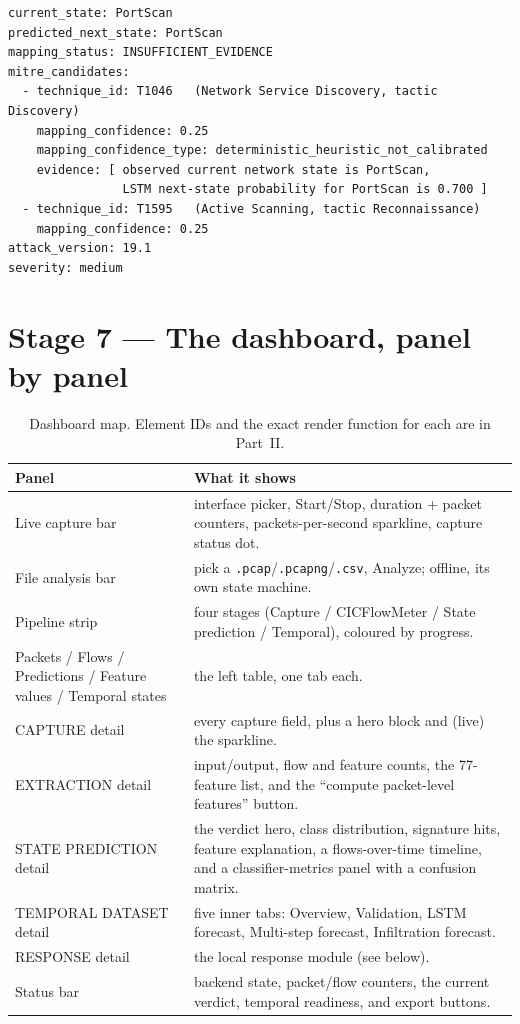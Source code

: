 \documentclass[11pt,a4paper]{article}
\begin{document}
\begin{lstlisting}[caption={\texttt{nids mitre map --state PortScan --prob PortScan=0.7 --prob BENIGN=0.3} (abridged)}]
current_state: PortScan
predicted_next_state: PortScan
mapping_status: INSUFFICIENT_EVIDENCE
mitre_candidates:
  - technique_id: T1046   (Network Service Discovery, tactic Discovery)
    mapping_confidence: 0.25
    mapping_confidence_type: deterministic_heuristic_not_calibrated
    evidence: [ observed current network state is PortScan,
                LSTM next-state probability for PortScan is 0.700 ]
  - technique_id: T1595   (Active Scanning, tactic Reconnaissance)
    mapping_confidence: 0.25
attack_version: 19.1
severity: medium
\end{lstlisting}

\section{Stage 7 --- The dashboard, panel by panel}

\begin{table}[H]\centering\small
\begin{tabular}{@{}p{3.2cm}p{11.5cm}@{}}
\toprule
\textbf{Panel} & \textbf{What it shows} \\ \midrule
Live capture bar & interface picker, Start/Stop, duration + packet counters,
  packets-per-second sparkline, capture status dot. \\
File analysis bar & pick a \texttt{.pcap}/\texttt{.pcapng}/\texttt{.csv}, Analyze;
  offline, its own state machine. \\
Pipeline strip & four stages (Capture / CICFlowMeter / State prediction /
  Temporal), coloured by progress. \\
Packets / Flows / Predictions / Feature values / Temporal states & the left
  table, one tab each. \\
CAPTURE detail & every capture field, plus a hero block and (live) the sparkline. \\
EXTRACTION detail & input/output, flow and feature counts, the 77-feature list,
  and the ``compute packet-level features'' button. \\
STATE PREDICTION detail & the verdict hero, class distribution, signature hits,
  feature explanation, a flows-over-time timeline, and a classifier-metrics
  panel with a confusion matrix. \\
TEMPORAL DATASET detail & five inner tabs: Overview, Validation, LSTM forecast,
  Multi-step forecast, Infiltration forecast. \\
RESPONSE detail & the local response module (see below). \\
Status bar & backend state, packet/flow counters, the current verdict, temporal
  readiness, and export buttons. \\
\bottomrule
\end{tabular}
\caption{Dashboard map. Element IDs and the exact render function for each are
in Part~II.}
\end{table}
\end{document}
